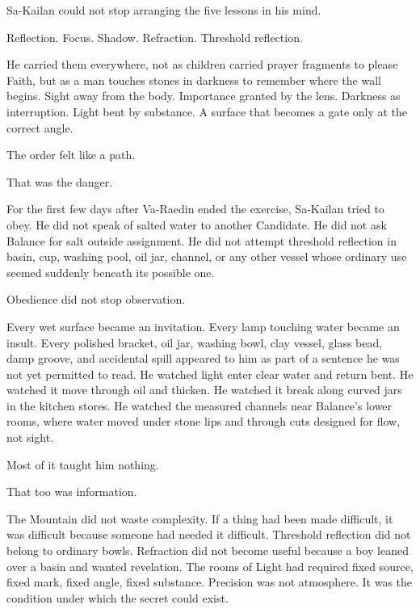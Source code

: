 

\noindent Sa-Kailan could not stop arranging the five lessons in his mind.\par

Reflection. Focus. Shadow. Refraction. Threshold reflection.\par

He carried them everywhere, not as children carried prayer fragments to please Faith, but as a man touches stones in darkness to remember where the wall begins. Sight away from the body. Importance granted by the lens. Darkness as interruption. Light bent by substance. A surface that becomes a gate only at the correct angle.\par

The order felt like a path.\par

That was the danger.\par

For the first few days after Va-Raedin ended the exercise, Sa-Kailan tried to obey. He did not speak of salted water to another Candidate. He did not ask Balance for salt outside assignment. He did not attempt threshold reflection in basin, cup, washing pool, oil jar, channel, or any other vessel whose ordinary use seemed suddenly beneath its possible one.\par

Obedience did not stop observation.\par

Every wet surface became an invitation. Every lamp touching water became an insult. Every polished bracket, oil jar, washing bowl, clay vessel, glass bead, damp groove, and accidental spill appeared to him as part of a sentence he was not yet permitted to read. He watched light enter clear water and return bent. He watched it move through oil and thicken. He watched it break along curved jars in the kitchen stores. He watched the measured channels near Balance’s lower rooms, where water moved under stone lips and through cuts designed for flow, not sight.\par

Most of it taught him nothing.\par

That too was information.\par

The Mountain did not waste complexity. If a thing had been made difficult, it was difficult because someone had needed it difficult. Threshold reflection did not belong to ordinary bowls. Refraction did not become useful because a boy leaned over a basin and wanted revelation. The rooms of Light had required fixed source, fixed mark, fixed angle, fixed substance. Precision was not atmosphere. It was the condition under which the secret could exist.\par


